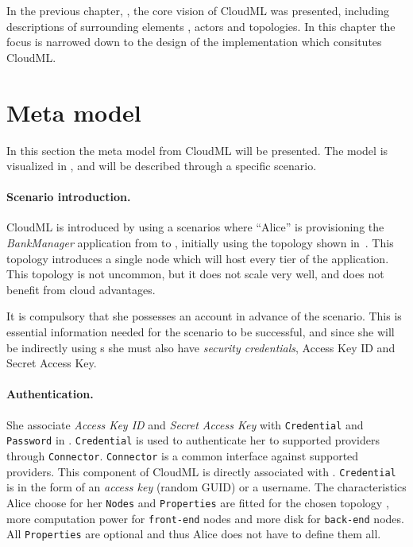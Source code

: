 
In the previous chapter, , the core vision of CloudML was presented,
including descriptions of surrounding elements \ie, actors and topologies.
In this chapter the focus is narrowed down to the design of the implementation which
consitutes CloudML.

\section{Meta model}

In this section the meta model from CloudML will be presented.
The model is visualized in , and will be described through a specific scenario.

\paragraph{Scenario introduction.}

CloudML is introduced by using a scenarios where ``Alice'' is provisioning the 
\emph{BankManager} application from  to ,
initially using the topology shown in~.
This topology introduces a single node which will host every tier of the application.
This topology is not uncommon, but it does not scale very well, 
and does not benefit from cloud advantages.

It is compulsory that she possesses an  account in advance of the scenario.
This is essential information needed for the scenario to be successful,
and since she will be indirectly using  s 
she must also have \emph{security credentials},
\ie Access Key ID and Secret Access Key.

\paragraph{Authentication.}

She associate \emph{Access Key ID} and \emph{Secret Access Key} with 
\texttt{Credential} and \texttt{Password} in .
\texttt{Credential} is used to authenticate her to supported providers through \texttt{Connector}.
\texttt{Connector} is a common interface against supported providers.
This component of CloudML is directly associated with .
\texttt{Credential} is in the form of an \emph{access key} (random GUID) or a username.
The characteristics Alice choose for her \texttt{Nodes} and \texttt{Properties} are fitted
for the chosen topology \eg, more computation power for \texttt{front-end} nodes and more disk for \texttt{back-end} nodes.
All \texttt{Properties} are optional and thus Alice does not have to define them all.

